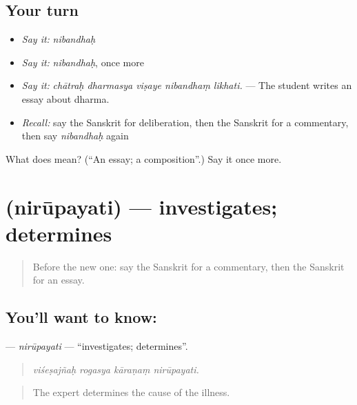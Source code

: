 \subsection*{Your turn}
\begin{itemize}
\raggedright
  \item \emph{Say it:} \emph{nibandhaḥ}
  \item \emph{Say it:} \emph{nibandhaḥ}, once more
  \item \emph{Say it:} \emph{chātraḥ dharmasya viṣaye nibandhaṃ likhati.} — The student writes an essay about dharma.
  \item \emph{Recall:} say the Sanskrit for deliberation, then the Sanskrit for a commentary, then say \emph{nibandhaḥ} again
\end{itemize}

\begin{tcolorbox}[breakable,colback=teal!4,colframe=teal!35!black,title={Before you move on}]
What does  mean? (\textquotedblleft{}An essay; a composition\textquotedblright{}.) Say it once more.
\end{tcolorbox}
\section[\texorpdfstring{\sk{निरूपयति} (nirūpayati)}{निरूपयति (nirūpayati)}]{ (nirūpayati) — investigates; determines}

\label{lesson:SA-C364-nirupayati}



\begin{quote}
Before the new one: say the Sanskrit for a commentary, then the Sanskrit for an essay.
\end{quote}

\subsection*{You'll want to know: }
\textbf{} — \emph{nirūpayati} — \textquotedblleft{}investigates; determines\textquotedblright{}.

\begin{quote}
   
\end{quote}

\begin{quote}
\emph{viśeṣajñaḥ rogasya kāraṇaṃ nirūpayati.}
\end{quote}

\begin{quote}
The expert determines the cause of the illness.
\end{quote}

